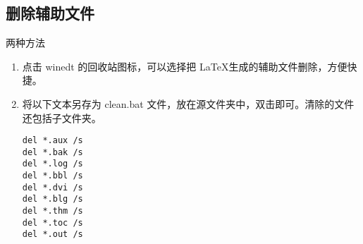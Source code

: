 \subsection{删除辅助文件}
两种方法
\begin{enumerate}
  \item 点击 winedt 的回收站图标，可以选择把 \LaTeX 生成的辅助文件删除，方便快捷。
  \item 将以下文本另存为 clean.bat 文件，放在源文件夹中，双击即可。\textcolor[rgb]{1.00,0.00,0.00}{清除的文件还包括子文件夹。}
\begin{shaded}
  \begin{Verbatim}
del *.aux /s
del *.bak /s
del *.log /s
del *.bbl /s
del *.dvi /s
del *.blg /s
del *.thm /s
del *.toc /s
del *.out /s
  \end{Verbatim}
\end{shaded}
\end{enumerate}




\clearpage
